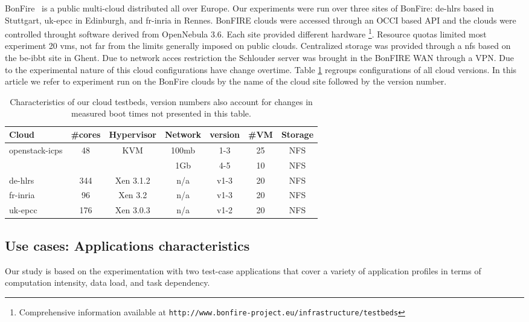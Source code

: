 BonFire~\cite{Kavoussanakis2013} is  a public  multi-cloud distributed  all over
Europe. Our experiments  were run over three sites of  BonFire: de-hlrs based in
Stuttgart, uk-epcc  in Edinburgh,  and fr-inria in  Rennes. BonFIRE  clouds were
accessed  through an  OCCI based  API and  the clouds  were controlled  throught
software derived from OpenNebula 3.6.  Each site provided different hardware%
\footnote{Comprehensive            information           available            at
  \texttt{http://www.bonfire-project.eu/infrastructure/testbeds}}.%
Resource quotas  limited most experiment  20 \acp{vm},  not far from  the limits
generally imposed on  public clouds. Centralized storage was  provided through a
\ac{nfs} based on  the be-ibbt site in Ghent.  Due  to network acces restriction
the Schlouder server was  brought in the BonFIRE WAN through a  VPN.  Due to the
experimental nature  of this  cloud configurations  have change  overtime. Table
\ref{tab:platforms}  regroups  configurations of  all  cloud  versions. In  this
article we  refer to experiment  run on  the BonFire clouds  by the name  of the
cloud site followed by the version number.

\begin{table}
	\begin{tabular}{|l|c|c|c|c|c|c|}
		\hline
		Cloud&\#cores&Hypervisor&Network&version&\#VM&Storage\\ \hline
		\multirow{2}{*}{openstack-icps}&\multirow{2}{*}{48}&
                \multirow{2}{*}{KVM}&100mb&1-3&25&NFS\\\cline{4-7}
		&&&1Gb&4-5&10&NFS\\\hline
		de-hlrs&344&Xen 3.1.2&n/a&v1-3&20&NFS\\\hline
		fr-inria&96&Xen 3.2&n/a&v1-3&20&NFS\\\hline
		uk-epcc&176&Xen 3.0.3&n/a&v1-2&20&NFS\\\hline

	\end{tabular}
	\caption{Characteristics of our cloud testbeds, version numbers also
	account for changes in measured boot times not presented in this table.}
	\label{tab:platforms}
\end{table}


\subsection{Use cases: Applications characteristics}
\label{sc:app}

Our study is  based on the experimentation with two  test-case applications that
cover a variety of application profiles  in terms of computation intensity, data
load, and task dependency.

